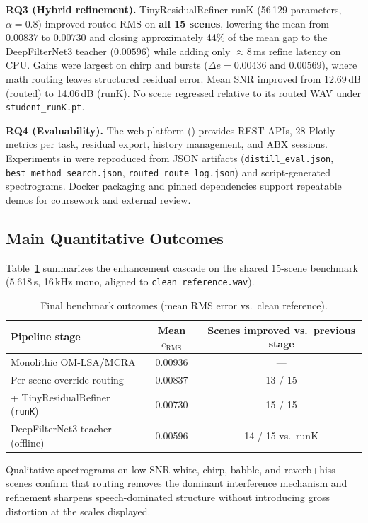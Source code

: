 \textbf{RQ3 (Hybrid refinement).}
TinyResidualRefiner runK (56\,129 parameters, $\alpha=0.8$) improved routed RMS on \textbf{all 15 scenes}, lowering the mean from $0.00837$ to $0.00730$ and closing approximately 44\% of the mean gap to the DeepFilterNet3 teacher ($0.00596$) while adding only $\approx 8$\,ms refine latency on CPU. Gains were largest on chirp and bursts ($\Delta e = 0.00436$ and $0.00569$), where math routing leaves structured residual error. Mean SNR improved from 12.69\,dB (routed) to 14.06\,dB (runK). No scene regressed relative to its routed WAV under \texttt{student\_runK.pt}.

\textbf{RQ4 (Evaluability).}
The web platform () provides REST APIs, 28 Plotly metrics per task, residual export, history management, and ABX sessions. Experiments in  were reproduced from JSON artifacts (\texttt{distill\_eval.json}, \texttt{best\_method\_search.json}, \texttt{routed\_route\_log.json}) and script-generated spectrograms. Docker packaging and pinned dependencies support repeatable demos for coursework and external review.

\subsection{Main Quantitative Outcomes}

Table~\ref{tab:final_outcomes} summarizes the enhancement cascade on the shared 15-scene benchmark (5.618\,s, 16\,kHz mono, aligned to \texttt{clean\_reference.wav}).

\begin{table}[H]
  \centering
  \caption{Final benchmark outcomes (mean RMS error vs.\ clean reference).}
  \label{tab:final_outcomes}
  \begin{tabular}{lcc}
    \toprule
    \textbf{Pipeline stage} & \textbf{Mean $e_{\mathrm{RMS}}$} & \textbf{Scenes improved vs.\ previous stage} \\
    \midrule
    Monolithic OM-LSA/MCRA & 0.00936 & --- \\
    Per-scene override routing & 0.00837 & 13 / 15 \\
    + TinyResidualRefiner (\texttt{runK}) & 0.00730 & 15 / 15 \\
    DeepFilterNet3 teacher (offline) & 0.00596 & 14 / 15 vs.\ runK \\
    \bottomrule
  \end{tabular}
\end{table}

Qualitative spectrograms on low-SNR white, chirp, babble, and reverb+hiss scenes confirm that routing removes the dominant interference mechanism and refinement sharpens speech-dominated structure without introducing gross distortion at the scales displayed.

